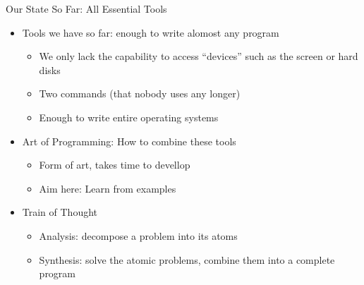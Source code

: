 
\begin{frame}[t,plain]
\titlepage
\end{frame}


\begin{frame}[fragile]{Our State So Far: All Essential Tools}
%
\begin{itemize}
\item Tools we have so far: enough to write alomost any program
	\begin{itemize}
	\item We only lack the capability to access \enquote{devices} such as the screen or hard disks
	\item Two commands (that nobody uses any longer)
	\item Enough to write entire operating systems
	\end{itemize}
\item Art of Programming: How to combine these tools
	\begin{itemize}
	\item Form of art, takes time to devellop
	\item Aim here: Learn from examples
	\end{itemize}
\item Train of Thought
	\begin{itemize}
	\item Analysis: decompose a problem into its atoms
	\item Synthesis: solve the atomic problems, combine them into a complete program
	\end{itemize}
\end{itemize}
%
\end{frame}


